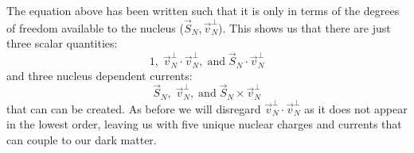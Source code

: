 The equation above has been written such that it is only in terms of the degrees of freedom available to the nucleus ($\vec{S}_{N},\vec{v}^{\perp}_{N}$).
This shows us that there are just three scalar quantities: 
\begin{equation}
    1,\; \vec{v}^{\perp}_{N} \cdot \vec{v}^{\perp}_{N}, \; \text{and} \; \vec{S}_{N} \cdot \vec{v}^{\perp}_{N}
\end{equation}
and three nucleus dependent currents:
\begin{equation}
    \vec{S}_{N},\; \vec{v}^{\perp}_{N}, \; \text{and} \; \vec{S}_{N} \times \vec{v}^{\perp}_{N}
\end{equation}
that can can be created.
As before we will disregard $\vec{v}^{\perp}_{N} \cdot \vec{v}^{\perp}_{N}$ as it does not appear in the lowest order, leaving us with five unique nuclear charges and currents that can couple to our dark matter.

